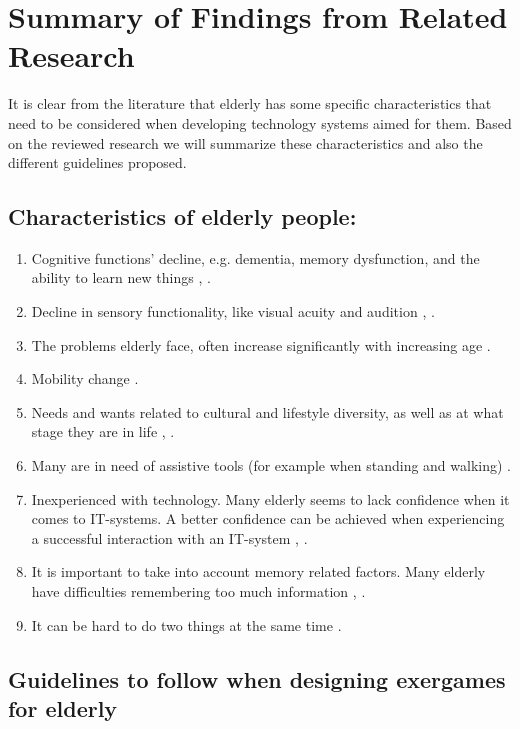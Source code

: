 \section{Summary of Findings from Related Research}
\label{sec:summaryguidelines}
It is clear from the literature that elderly has some specific characteristics that need to be considered when developing technology systems aimed for them. Based on the reviewed research we will summarize these characteristics and also the different guidelines proposed.

\subsection{Characteristics of elderly people:}
\label{subsec:characteristics}
\begin{enumerate}[{c}.1]
\item Cognitive functions' decline, e.g. dementia, memory dysfunction, and the ability to learn new things \cite{Billis}, \cite{gregor}.
\item Decline in sensory functionality, like  visual acuity and audition \cite{Billis}, \cite{gregor}.
\item The problems elderly face, often increase significantly with increasing age \cite{gregor}.
\item Mobility change \cite{Billis}.
\item Needs and wants related to cultural and lifestyle diversity, as well as at what stage they are in life \cite{Billis}, \cite{gregor}.
\item Many are in need of assistive tools (for example when standing and walking) \cite{gregor}.
\item Inexperienced with technology. Many elderly seems to lack confidence when it comes to IT-systems. A better confidence can be achieved when experiencing a successful interaction with an IT-system \cite{Billis}, \cite{gregor}.
\item It is important to take into account memory related factors. Many elderly have difficulties remembering too much information \cite{Billis}, \cite{gregor}.
\item It can be hard to do two things at the same time \cite{bruin}.
\end{enumerate}

\subsection{Guidelines to follow when designing exergames for elderly}
\label{subsec:guidelines}

